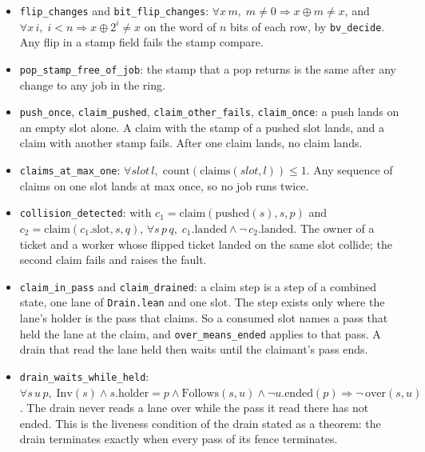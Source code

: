 \begin{itemize}
\item \texttt{flip\_\allowbreak{}changes} and \texttt{bit\_\allowbreak{}flip\_\allowbreak{}changes}: \(\forall x\, m,\; m \neq 0 \Rightarrow x \oplus m \neq x\), and \(\forall x\, i,\; i < n \Rightarrow x \oplus 2^{i} \neq x\) on the word of \(n\) bits of each row, by \texttt{bv\_\allowbreak{}decide}. Any flip in a stamp field fails the stamp compare.
\item \texttt{pop\_\allowbreak{}stamp\_\allowbreak{}free\_\allowbreak{}of\_\allowbreak{}job}: the stamp that a pop returns is the same after any change to any job in the ring.
\item \texttt{push\_\allowbreak{}once}, \texttt{claim\_\allowbreak{}pushed}, \texttt{claim\_\allowbreak{}other\_\allowbreak{}fails}, \texttt{claim\_\allowbreak{}once}: a push lands on an empty slot alone. A claim with the stamp of a pushed slot lands, and a claim with another stamp fails. After one claim lands, no claim lands.
\item \texttt{claims\_\allowbreak{}at\_\allowbreak{}max\_\allowbreak{}one}: \(\forall \mathit{slot}\, l,\; \mathrm{count}(\mathrm{claims}(\mathit{slot}, l)) \le 1\). Any sequence of claims on one slot lands at max once, so no job runs twice.
\item \texttt{collision\_\allowbreak{}detected}: with \(c_1 = \mathrm{claim}(\mathrm{pushed}(s), s, p)\) and \(c_2 = \mathrm{claim}(c_1.\mathrm{slot}, s, q)\), \(\forall s\, p\, q,\; c_1.\mathrm{landed} \land \neg\, c_2.\mathrm{landed}\). The owner of a ticket and a worker whose flipped ticket landed on the same slot collide; the second claim fails and raises the fault.
\item \texttt{claim\_\allowbreak{}in\_\allowbreak{}pass} and \texttt{claim\_\allowbreak{}drained}: a claim step is a step of a combined state, one lane of \texttt{Drain.\allowbreak{}lean} and one slot. The step exists only where the lane's holder is the pass that claims. So a consumed slot names a pass that held the lane at the claim, and \texttt{over\_\allowbreak{}means\_\allowbreak{}ended} applies to that pass. A drain that read the lane held then waits until the claimant's pass ends.
\item \texttt{drain\_\allowbreak{}waits\_\allowbreak{}while\_\allowbreak{}held}: \(\forall s\, u\, p,\; \mathrm{Inv}(s) \land s.\mathrm{holder} = p \land \mathrm{Follows}(s, u) \land \neg u.\mathrm{ended}(p) \Rightarrow \neg\,\mathrm{over}(s, u)\). The drain never reads a lane over while the pass it read there has not ended. This is the liveness condition of the drain stated as a theorem: the drain terminates exactly when every pass of its fence terminates.
\end{itemize}

